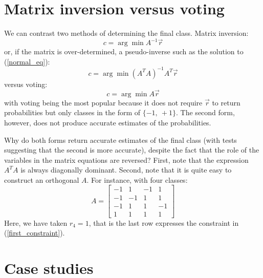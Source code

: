 \documentclass{article}
\begin{document}
\section{Matrix inversion versus voting}

We can contrast two methods of determining the final class.  Matrix inversion:
\begin{equation}
c=\arg \min A^{-1} \vec r
\end{equation}
or, if the matrix is over-determined, a pseudo-inverse such as
the solution to (\ref{normal_eq}):
\begin{equation}
c=\arg \min (A^T A)^{-1}A^T \vec r
\label{pseudoinverse}
\end{equation}
versus voting:
\begin{equation}
c=\arg \min A \vec r
\label{voting}
\end{equation}
with voting being the most popular because it does not require $\vec r$ to
return probabilities but only classes in the form of $\lbrace -1,~+1\rbrace$.
The second form, however, does not produce accurate estimates of the
probabilities.

Why do both forms return accurate estimates of the final class (with tests
suggesting that the second is more accurate), despite the fact that the
role of the variables in the matrix equations are reversed?
First, note that the expression $A^T A$ is always diagonally dominant.
Second, note that it
is quite easy to construct an orthogonal $A$.
For instance, with four classes:
\begin{equation}
A=\left [
\begin{array}{cccc}
-1 & 1 & -1 & 1 \\
-1 & -1 & 1 & 1 \\
-1 & 1 & 1 & -1 \\
1 & 1 & 1 & 1
\label{ortho3}
\end{array}
\right ]
\end{equation}
Here, we have taken $r_4=1$, that is the last row expresses the constraint
in (\ref{first_constraint}).

\section{Case studies}
\end{document}

